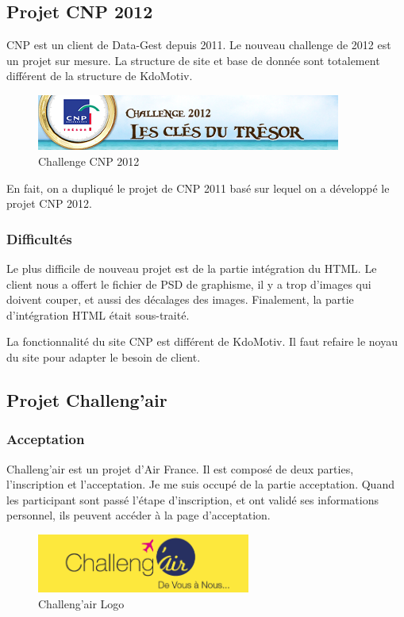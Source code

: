\subsection{Projet CNP 2012}
CNP est un client de Data-Gest depuis 2011. Le nouveau challenge de 2012 est un projet sur mesure. La structure de site et base de donnée sont totalement différent de la structure de KdoMotiv.

\begin{figure}[hbtp]
\centering
\includegraphics[width=10cm]{body/images/cnp-2012.png}
\caption{Challenge CNP 2012}
\end{figure}

En fait, on a dupliqué le projet de CNP 2011 basé sur lequel on a développé le projet CNP 2012.

\subsubsection{Difficultés} 
Le plus difficile de nouveau projet est de la partie intégration du HTML. Le client nous a offert le fichier de PSD de graphisme, il y a trop d'images qui doivent couper, et aussi des décalages des images. Finalement, la partie d'intégration HTML était sous-traité. 

La fonctionnalité du site CNP est différent de KdoMotiv. Il faut refaire le noyau du site pour adapter le besoin de client. 



\subsection{Projet Challeng'air}

\subsubsection{Acceptation}
Challeng'air est un projet d'Air France.  Il est composé de deux parties, l'inscription et l'acceptation. Je me suis occupé de la partie acceptation.
Quand les participant sont passé l'étape d'inscription, et ont validé ses informations personnel, ils peuvent accéder à la page d'acceptation. 
\begin{figure}[hbtp]
\caption{Challeng'air Logo}
\centering
\includegraphics[width=7cm]{body/images/challengair.png}
\end{figure}

